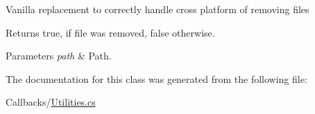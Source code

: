 Vanilla replacement to correctly handle cross platform of removing files 

\begin{DoxyReturn}{Returns}
{\ttfamily true}, if file was removed, {\ttfamily false} otherwise.
\end{DoxyReturn}

\begin{DoxyParams}{Parameters}
{\em path} & Path.\\
\hline
\end{DoxyParams}


The documentation for this class was generated from the following file\+:\begin{DoxyCompactItemize}
\item 
Callbacks/\hyperlink{Utilities_8cs}{Utilities.\+cs}\end{DoxyCompactItemize}
